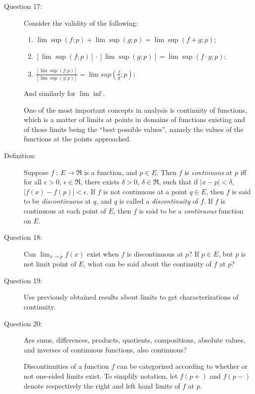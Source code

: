 \documentclass{article}
\begin{document}
\begin{description}
  \item[Question 17:] Consider the validity of the following:
    \begin{enumerate}[\hspace{1cm}(1)]
      \item $\lim \sup (f;p) + \lim \sup (g;p) = \lim \sup (f + g ; p)$;
      \item $[\lim \sup (f;p)] \cdot [\lim \sup (g;p)] = \lim \sup (f \cdot g ; p)$;
      \item $\frac{ [\lim \sup (f;p)] }{ [\lim \sup (g;p)] } = \lim sup \left( \frac{f}{g} ; p \right)$;
    \end{enumerate}
    And similarly for $\lim \inf$.

  \item[] One of the most important concepts in analysis is continuity of functions, which is a matter of limits at points in domains of functions existing and of those limits being the ``best possible values'', namely the values of the functions at the points approached.

  \item[Definition:] Suppose $f\ :\ E \to \Re$ is a function, and $p \in E$. Then $f$ is \emph{continuous} at $p$ iff for all $\epsilon > 0$, $\epsilon \in \Re$, there exists $\delta > 0$, $\delta \in \Re$, such that if $|x-p| < \delta$, $|f(x) - f(p)| < \epsilon$. If $f$ is not continuous at a point $q \in E$, then $f$ is said to be \emph{discontinuous} at $q$, and $q$ is called a \emph{discontinuity} of $f$. If $f$ is continuous at each point of $E$, then $f$ is said to be a \emph{continuous} function on $E$.

  \item[Question 18:] Can $\displaystyle \lim_{x \to p} f(x)$ exist when $f$ is discontinuous at $p$? If $p \in E$, but $p$ is not limit point of $E$, what can be said about the continuity of $f$ at $p$?

  \item[Question 19:] Use previously obtained results about limits to get characterizations of continuity.

  \item[Question 20:] Are sums, differences, products, quotients, compositions, absolute values, and inverses of continuous functions, also continuous?

  \item[] Discontinuities of a function $f$ can be categorized according to whether or not one-sided limits exist. To simplify notation, let $f(p+)$ and $f(p-)$ denote respectively the right and left hand limits of $f$ at $p$.


\end{description}
\end{document}
